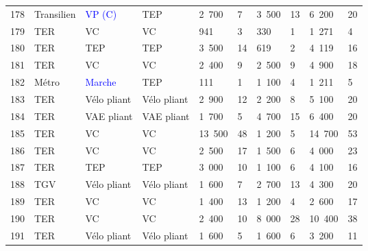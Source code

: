 \begin{longtable}{p{0.7cm}p{1.4cm}p{1.4cm}p{1.6cm}p{0.8cm}p{0.8cm}p{0.8cm}p{0.8cm}p{1.1cm}p{1.1cm}}
    \small{178} & \small{Transilien} & \small{\textcolor{blue}{VP (C)}} & \small{TEP} & \small{2~700} & \small{7} & \small{3~500} & \small{13} & \small{6~200} & \small{20}\\
    \small{179} & \small{TER} & \small{VC} & \small{VC} & \small{941} & \small{3} & \small{330} & \small{1} & \small{1~271} & \small{4}\\
    \small{180} & \small{TER} & \small{TEP} & \small{TEP} & \small{3~500} & \small{14} & \small{619} & \small{2} & \small{4~119} & \small{16}\\
    \small{181} & \small{TER} & \small{VC} & \small{VC} & \small{2~400} & \small{9} & \small{2~500} & \small{9} & \small{4~900} & \small{18}\\
    \small{182} & \small{Métro} & \small{\textcolor{blue}{Marche}} & \small{TEP} & \small{111} & \small{1} & \small{1~100} & \small{4} & \small{1~211} & \small{5}\\
    \small{183} & \small{TER} & \small{Vélo pliant} & \small{Vélo pliant} & \small{2~900} & \small{12} & \small{2~200} & \small{8} & \small{5~100} & \small{20}\\
    \small{184} & \small{TER} & \small{VAE pliant} & \small{VAE pliant} & \small{1~700} & \small{5} & \small{4~700} & \small{15} & \small{6~400} & \small{20}\\
    \small{185} & \small{TER} & \small{VC} & \small{VC} & \small{13~500} & \small{48} & \small{1~200} & \small{5} & \small{14~700} & \small{53}\\
    \small{186} & \small{TER} & \small{VC} & \small{VC} & \small{2~500} & \small{17} & \small{1~500} & \small{6} & \small{4~000} & \small{23}\\
    \small{187} & \small{TER} & \small{TEP} & \small{TEP} & \small{3~000} & \small{10} & \small{1~100} & \small{6} & \small{4~100} & \small{16}\\
    \small{188} & \small{TGV} & \small{Vélo pliant} & \small{Vélo pliant} & \small{1~600} & \small{7} & \small{2~700} & \small{13} & \small{4~300} & \small{20}\\
    \small{189} & \small{TER} & \small{VC} & \small{VC} & \small{1~400} & \small{13} & \small{1~200} & \small{4} & \small{2~600} & \small{17}\\
    \small{190} & \small{TER} & \small{VC} & \small{VC} & \small{2~400} & \small{10} & \small{8~000} & \small{28} & \small{10~400} & \small{38}\\
    \small{191} & \small{TER} & \small{Vélo pliant} & \small{Vélo pliant} & \small{1~600} & \small{5} & \small{1~600} & \small{6} & \small{3~200} & \small{11}\\

\end{longtable}
